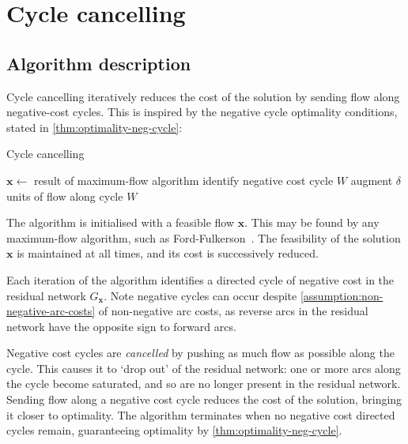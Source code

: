 \section{Cycle cancelling} \label{appendix:impl-cc}

\subsection{Algorithm description}

Cycle cancelling iteratively reduces the cost of the solution by sending flow along negative-cost cycles. This is inspired by the negative cycle optimality conditions, stated in \cref{thm:optimality-neg-cycle}:\\

\optimalitynegcycle*

\begin{algorithm}
    \caption{Cycle cancelling}
    \label{algo:cycle-cancelling}
    \begin{algorithmic}[1]
        \State $\mathbf{x}\gets $ result of maximum-flow algorithm 
        \State identify negative cost cycle $W$ 
        \State augment $\delta$ units of flow along cycle $W$
        \EndWhile{}
    \end{algorithmic}
\end{algorithm}

The algorithm is initialised with a feasible flow $\mathbf{x}$. This may be found by any maximum-flow algorithm, such as Ford-Fulkerson~\cite{FordFulkerson:1956}. The feasibility of the solution $\mathbf{x}$ is maintained at all times, and its cost is successively reduced. 

Each iteration of the algorithm identifies a directed cycle of negative cost in the residual network $G_\mathbf{x}$. Note negative cycles can occur despite \cref{assumption:non-negative-arc-costs} of non-negative arc costs, as reverse arcs in the residual network have the opposite sign to forward arcs.

Negative cost cycles are \emph{cancelled} by pushing as much flow as possible along the cycle. This causes it to `drop out' of the residual network: one or more arcs along the cycle become saturated, and so are no longer present in the residual network. Sending flow along a negative cost cycle reduces the cost of the solution, bringing it closer to optimality. The algorithm terminates when no negative cost directed cycles remain, guaranteeing optimality by \cref{thm:optimality-neg-cycle}.

